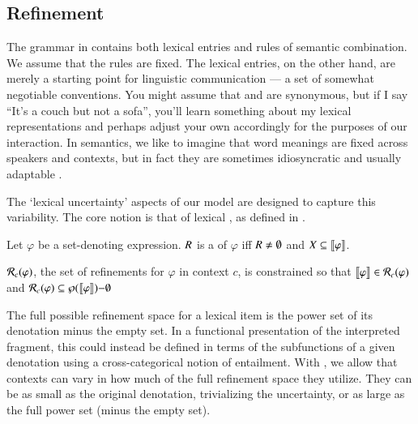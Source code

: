 \documentclass[leqno,12pt]{article}
\begin{document}

\subsection{Refinement}\label{sec:refine}

The grammar in  contains both lexical entries and
rules of semantic combination. We assume that the rules are fixed.
The lexical entries, on the other hand, are merely a starting point
for linguistic communication --- a set of somewhat negotiable
conventions. You might assume that  and  are
synonymous, but if I say ``It's a couch but not a sofa'', you'll learn
something about my lexical representations and perhaps adjust your own
accordingly for the purposes of our interaction. In semantics, we like
to imagine that word meanings are fixed across speakers and contexts,
but in fact they are sometimes idiosyncratic and usually adaptable
\citep{Clark97}.

The `lexical uncertainty' aspects of our model are designed to capture
this variability. The core notion is that of lexical
, as defined in .
%
\begin{examples}
\item\label{refinement} 
  \begin{examples}
  \item Let $\varphi$ be a set-denoting expression. $R$ is a
     of $\varphi$ iff $R \neq \emptyset$ and
    $X \subseteq \llbracket\varphi\rrbracket$.
  \item\label{refine} $\mathcal{R}_{c}(\varphi)$, the set of refinements for
    $\varphi$ in context $c$, is constrained so that
    $\llbracket\varphi\rrbracket \in \mathcal{R}_{c}(\varphi)$ and
    $\mathcal{R}_{c}(\varphi) \subseteq \wp(\llbracket\varphi\rrbracket){-}\emptyset$
  \end{examples}
\end{examples}
%
The full possible refinement space for a lexical item is the power set
of its denotation minus the empty set. In a functional presentation of
the interpreted fragment, this could instead be defined in terms of
the subfunctions of a given denotation using a cross-categorical
notion of entailment. With , we allow that
contexts can vary in how much of the full refinement space they
utilize. They can be as small as the original denotation, trivializing
the uncertainty, or as large as the full power set (minus the empty
set).
\end{document}

